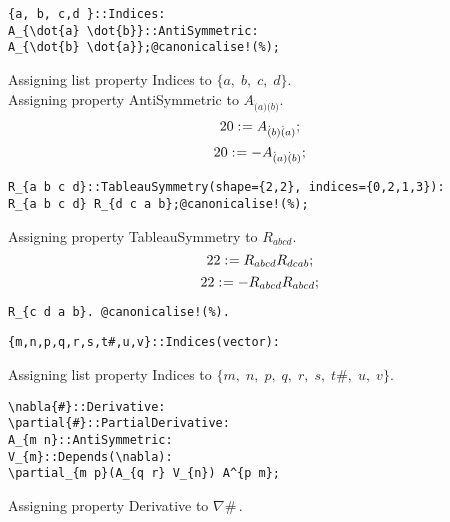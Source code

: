 \documentclass[11pt]{article}
\def\specialcolon{\mathrel{\mathop{:}}\hspace{-.5em}}
\begin{document}
{\color[named]{Blue}\begin{verbatim}
{a, b, c,d }::Indices:
A_{\dot{a} \dot{b}}::AntiSymmetric:
A_{\dot{b} \dot{a}};@canonicalise!(%);
\end{verbatim}}
Assigning list property Indices to $\{a,\; b,\; c,\; d\}$.
\\
Assigning property AntiSymmetric to ${A}_{\dot(a) \dot(b)}$.
\\
\begin{dmath*}[compact, spread=2pt]
20\specialcolon{}= {A}_{\dot(b) \dot(a)};
\end{dmath*}
\begin{dmath*}[compact, spread=2pt]
20\specialcolon{}= -{A}_{\dot(a) \dot(b)};
\end{dmath*}
{\color[named]{Blue}\begin{verbatim}
R_{a b c d}::TableauSymmetry(shape={2,2}, indices={0,2,1,3}):
R_{a b c d} R_{d c a b};@canonicalise!(%);
\end{verbatim}}
Assigning property TableauSymmetry to ${R}_{a b c d}$.
\\
\begin{dmath*}[compact, spread=2pt]
22\specialcolon{}= {R}_{a b c d} {R}_{d c a b};
\end{dmath*}
\begin{dmath*}[compact, spread=2pt]
22\specialcolon{}= -{R}_{a b c d} {R}_{a b c d};
\end{dmath*}
{\color[named]{Blue}\begin{verbatim}
R_{c d a b}. @canonicalise!(%).
\end{verbatim}}
{\color[named]{Blue}\begin{verbatim}
{m,n,p,q,r,s,t#,u,v}::Indices(vector):
\end{verbatim}}
Assigning list property Indices to $\{m,\; n,\; p,\; q,\; r,\; s,\; t\#,\; u,\; v\}$.
\\
{\color[named]{Blue}\begin{verbatim}
\nabla{#}::Derivative:
\partial{#}::PartialDerivative:
A_{m n}::AntiSymmetric:
V_{m}::Depends(\nabla):
\partial_{m p}(A_{q r} V_{n}) A^{p m};
\end{verbatim}}
Assigning property Derivative to $\nabla{\#}\, $.
\end{document}
